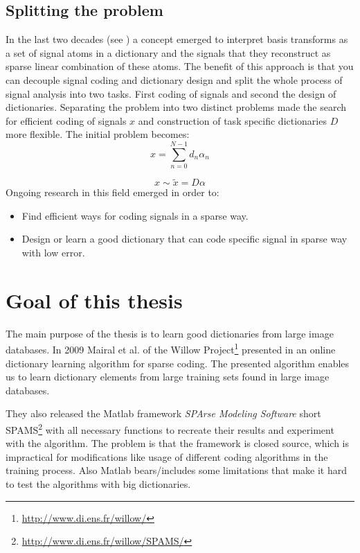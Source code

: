 \subsection{Splitting the problem}
\cite{Rubinstein2010}
In the last two decades (see\cite{Olshausen1996,Mallat1993} ) a concept emerged
to interpret basis transforms as a set of signal atoms in a dictionary and the
signals that they reconstruct as sparse
linear combination of these atoms.  The benefit of this approach is that you can
decouple signal coding and dictionary design and split the whole process of
signal analysis into two tasks. First coding of signals and second the design
of dictionaries. Separating the problem into two distinct problems made the
search for efficient coding of signals $x$ and construction of task specific
dictionaries $D$ more flexible\cite{?}. The initial problem becomes:
\begin{equation}
x = \sum_{n=0}^{N-1}d_n\alpha_n
\end{equation}

\begin{equation}
 x \sim \tilde{x} = D\alpha
\end{equation}
Ongoing research in this field emerged in order to:
\begin{itemize}
 \item Find efficient ways for coding signals in a sparse way.
 \item Design or learn a good dictionary that can code specific signal in sparse
way with low error.
\end{itemize}


\section{Goal of this thesis}
The main purpose of the thesis is to learn good dictionaries from large
image databases. %
In 2009 Mairal et al. of the Willow
Project\footnote{\url{http://www.di.ens.fr/willow/}} presented in
\cite{Mairal2009,Mairal2010} an online dictionary learning algorithm for sparse
coding. The presented algorithm enables us to learn dictionary elements from
large training sets found in large image databases.

They also released the Matlab framework \emph{SPArse Modeling Software}
short SPAMS\footnote{\url{http://www.di.ens.fr/willow/SPAMS/}} with all
necessary functions to recreate their results and experiment with the algorithm.
The problem is that the framework is closed source, which is impractical for
modifications like usage of different coding algorithms in the training process.
Also Matlab bears/includes some limitations that make it hard to test the
algorithms with big dictionaries.

